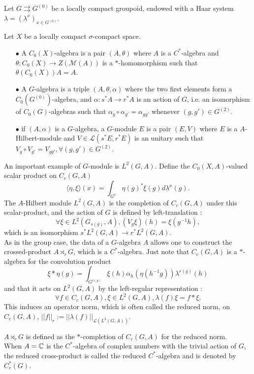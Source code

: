 Let $G \rightrightarrows G^{(0)}$ be a locally compact groupoid, endowed with a Haar system $\lambda = (\lambda^x)_{x\in G^{(0)}}$.\\

\begin{definition}
Let $X$ be a locally compact $\sigma$-compact space.\\
\begin{itemize}
\item[$\bullet$] A $C_0(X)$-algebra is a pair $(A,\theta)$ where $A$ is a $C^*$-algebra and $\theta : C_0(X)\rightarrow Z(\mathcal M (A))$ is a $*$-homomorphism such that $\theta (C_0(X))A = A$.\\
\item[$\bullet$] A $G$-algebra is a triple $(A,\theta,\alpha)$ where the two first elements form a $C_0(G^{(0)})$-algebra, and $\alpha : s^* A \rightarrow r^* A $ is an action of $G$, i.e. an isomorphism of $C_0(G)$-algebras such that $\alpha_g \circ \alpha_{g'} = \alpha_{gg'}$ whenever $(g,g')\in G^{(2)}$.\\ 
\item[$\bullet$] if $(A,\alpha)$ is a $G$-algebra, a $G$-module $E$ is a pair $(E,V)$ where $E$ is a $A$-Hilbert-module and $V\in \mathcal L(s^*E,r^*E)$ is an unitary such that $V_g\circ V_{g'} = V_{gg'},\forall (g,g')\in G^{(2)}$.
\end{itemize}
\end{definition}

An important example of $G$-module is $L^2(G,A)$. Define the $C_0(X,A)$-valued scalar product on $C_c(G,A)$
\[ \langle \eta,\xi \rangle(x) = \int_{G^x} \eta(g)^* \xi(g) d\lambda^x(g).\]
The $A$-Hilbert module $L^2(G,A)$ is the completion of $C_c(G,A)$ under this scalar-product, and the action of $G$ is defined by left-translation :
\[\forall \xi\in L^2(G_{s(g)},A),(V_g \xi)(h) = \xi(g^{-1}h), \]
which is an isomorphism $s^*L^2(G,A)\rightarrow r^*L^2(G,A)$.\\

As in the group case, the data of a $G$-algebra $A$ allows one to construct the crossed-product $A\rtimes_r G$, which is a $C^*$-algebra. Just note that $C_c(G,A)$ is a $*$-algebra for the convolution product 
\[\xi \ast \eta  (g)=\int_{G^{r(g)}} \xi(h)\alpha_{h}(\eta(h^{-1}g))\lambda^{r(g)}(h)\]
and that it acts on $L^2(G,A)$ by the left-regular representation :
\[\forall f\in C_c(G,A), \xi\in L^2(G,A),\lambda (f)\xi = f\ast \xi.\]
This induces an operator norm, which is often called the reduced norm, on $C_c(G,A)$, $||f||_{r}:= ||\lambda(f)||_{\mathcal L(L^2(G,A))}$.
\begin{definition}
$A\rtimes_r G$ is defined as the $*$-completion of $C_c(G,A)$ for the reduced norm. \\
When $A=\mathbb C$ is the $C^*$-algebra of complex numbers with the trivial action of $G$, the reduced cross-product is called the reduced $C^*$-algebra and is denoted by $C^*_r(G)$.\\
\end{definition}

